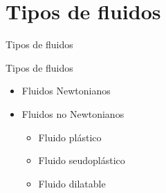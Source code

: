 \documentclass [xcolor=svgnames, t] {beamer}
\begin{document}
\section{Tipos de fluidos}
\begin{frame}{Tipos de fluidos}
\begin{block}{Tipos de fluidos}
\begin{itemize}
\item Fluidos Newtonianos
\item Fluidos no Newtonianos
\begin{itemize}
\item Fluido pl\'astico
\item Fluido seudopl\'astico
\item Fluido dilatable
\end{itemize}
\end{itemize}
\end{block}
\end{frame}
\end{document}
